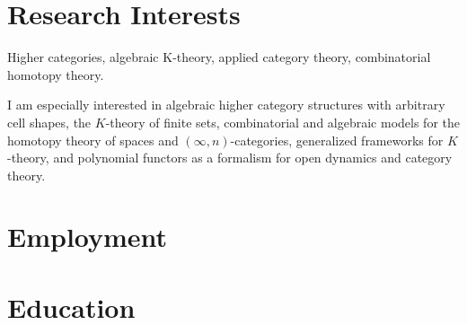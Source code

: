 \documentclass{moderncv}
\begin{document}
\vspace*{-1cm}

\makecvtitle

\vspace*{-1cm}

\section{Research Interests}

Higher categories, algebraic K-theory, applied category theory, combinatorial homotopy theory. 

\vspace{.2cm}

I am especially interested in algebraic higher category structures with arbitrary cell shapes, the $K$-theory of finite sets, combinatorial and algebraic models for the homotopy theory of spaces and $(\infty,n)$-categories, generalized frameworks for $K$-theory, and polynomial functors as a formalism for open dynamics and category theory.



\section{Employment}




\section{Education}






\end{document}
